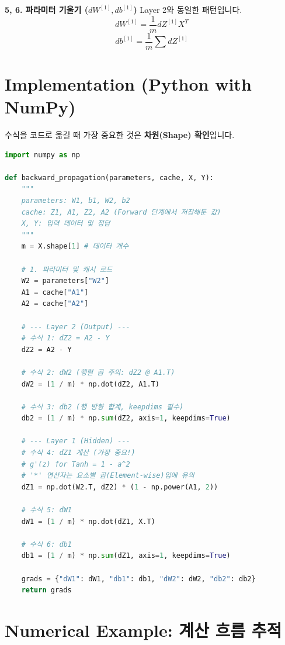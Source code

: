 \documentclass[11pt,a4paper]{book}
\theoremstyle{definition}
\begin{document}
\textbf{5, 6. 파라미터 기울기 ($dW^{[1]}, db^{[1]}$)}
Layer 2와 동일한 패턴입니다.
$$ dW^{[1]} = \frac{1}{m} dZ^{[1]} X^T $$
$$ db^{[1]} = \frac{1}{m} \sum dZ^{[1]} $$

\section{Implementation (Python with NumPy)}

수식을 코드로 옮길 때 가장 중요한 것은 \textbf{차원(Shape) 확인}입니다.

\begin{lstlisting}[language=Python, caption=Full Backpropagation Implementation, breaklines=true]
import numpy as np

def backward_propagation(parameters, cache, X, Y):
    """
    parameters: W1, b1, W2, b2
    cache: Z1, A1, Z2, A2 (Forward 단계에서 저장해둔 값)
    X, Y: 입력 데이터 및 정답
    """
    m = X.shape[1] # 데이터 개수
    
    # 1. 파라미터 및 캐시 로드
    W2 = parameters["W2"]
    A1 = cache["A1"]
    A2 = cache["A2"]
    
    # --- Layer 2 (Output) ---
    # 수식 1: dZ2 = A2 - Y
    dZ2 = A2 - Y
    
    # 수식 2: dW2 (행렬 곱 주의: dZ2 @ A1.T)
    dW2 = (1 / m) * np.dot(dZ2, A1.T)
    
    # 수식 3: db2 (행 방향 합계, keepdims 필수)
    db2 = (1 / m) * np.sum(dZ2, axis=1, keepdims=True)
    
    # --- Layer 1 (Hidden) ---
    # 수식 4: dZ1 계산 (가장 중요!)
    # g'(z) for Tanh = 1 - a^2
    # '*' 연산자는 요소별 곱(Element-wise)임에 유의
    dZ1 = np.dot(W2.T, dZ2) * (1 - np.power(A1, 2))
    
    # 수식 5: dW1
    dW1 = (1 / m) * np.dot(dZ1, X.T)
    
    # 수식 6: db1
    db1 = (1 / m) * np.sum(dZ1, axis=1, keepdims=True)
    
    grads = {"dW1": dW1, "db1": db1, "dW2": dW2, "db2": db2}
    return grads
\end{lstlisting}

\section{Numerical Example: 계산 흐름 추적}
\end{document}
